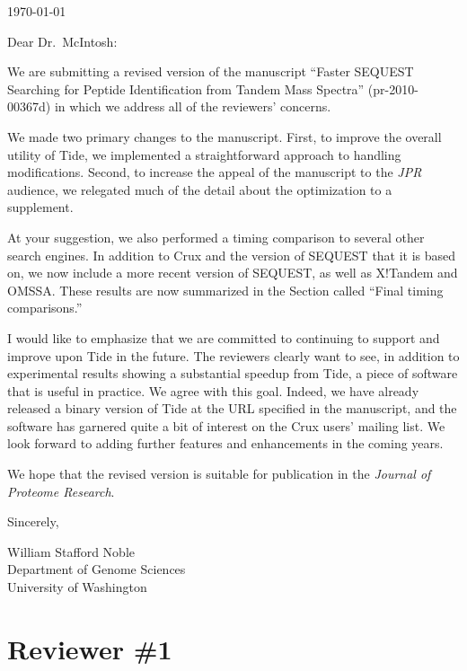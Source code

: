 \documentclass{article}
\begin{document}
\hspace*{3.0in}\today

\vspace*{3ex}

\noindent
Dear Dr.\ McIntosh:

\vspace*{1ex}

We are submitting a revised version of the manuscript ``Faster SEQUEST
Searching for Peptide Identification from Tandem Mass Spectra''
(pr-2010-00367d) in which we address all of the reviewers' concerns.

We made two primary changes to the manuscript.  First, to improve the
overall utility of Tide, we implemented a straightforward approach to
handling modifications.  Second, to increase the appeal of the
manuscript to the {\em JPR} audience, we relegated much of the detail
about the optimization to a supplement.

At your suggestion, we also performed a timing comparison to several
other search engines. In addition to Crux and the version of SEQUEST
that it is based on, we now include a more recent version of SEQUEST,
as well as X!Tandem and OMSSA. These results are now summarized in the
Section called ``Final timing comparisons.''

I would like to emphasize that we are committed to continuing to
support and improve upon Tide in the future.  The reviewers clearly
want to see, in addition to experimental results showing a substantial
speedup from Tide, a piece of software that is useful in practice.  We
agree with this goal.  Indeed, we have already released a binary
version of Tide at the URL specified in the manuscript, and the
software has garnered quite a bit of interest on the Crux users'
mailing list.  We look forward to adding further features and
enhancements in the coming years.

We hope that the revised version is suitable for publication
in the {\em Journal of Proteome Research}.

\vspace*{1ex}

\noindent
Sincerely,

\hspace*{1ex}

\noindent
William Stafford Noble\\
Department of Genome Sciences\\
University of Washington

\clearpage
\section*{Reviewer \#1}
\end{document}

